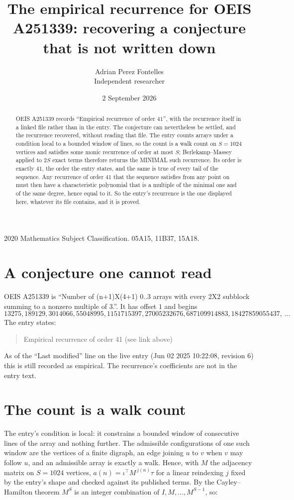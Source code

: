 \documentclass[11pt,a4paper]{article}
\title{The empirical recurrence for OEIS A251339: recovering a conjecture that is not written down}
\author{Adrian Perez Fontelles\\ \small Independent researcher}
\date{2 September 2026}
\theoremstyle{plain}
\theoremstyle{definition}
\begin{document}
\maketitle

\begin{abstract}
OEIS A251339 records ``Empirical recurrence of order $41$'', with the recurrence itself in a
linked file rather than in the entry. The conjecture can nevertheless be settled, and the
recurrence recovered, without reading that file. The entry counts arrays under a condition
local to a bounded window of lines, so the count is a walk count on $S=1024$ vertices and
satisfies some monic recurrence of order at most $S$; Berlekamp--Massey applied to $2S$ exact
terms therefore returns the MINIMAL such recurrence. Its order is exactly $41$, the order
the entry states, and the same is true of every tail of the sequence. Any recurrence of order
$41$ that the sequence satisfies from any point on must then have a characteristic
polynomial that is a multiple of the minimal one and of the same degree, hence equal to it. So
the entry's recurrence is the one displayed here, whatever its file contains, and it is
proved.
\end{abstract}

\noindent\small 2020 Mathematics Subject Classification. 05A15, 11B37, 15A18.\normalsize

\section{A conjecture one cannot read}

OEIS A251339 is ``Number of (n+1)X(4+1) 0..3 arrays with every 2X2 subblock summing to a nonzero multiple of 3.''. It has offset $1$ and begins
\[
13275, 189129, 3014066, 55048995, 1151715397, 27005232676, 687109914883, 18427859055437,\ \dots
\]
The entry states:
\begin{quote}
Empirical recurrence of order 41 (see link above)
\end{quote}
As of the ``Last modified'' line on the live entry (Jun 02 2025 10:22:08, revision 6) this is still
recorded as empirical. The recurrence's coefficients are not in the entry text.

\section{The count is a walk count}

The entry's condition is local: it constrains a bounded window of consecutive lines of the
array and nothing further. The admissible configurations of one such window are the vertices
of a finite digraph, an edge joining $u$ to $v$ when $v$ may follow $u$, and an admissible
array is exactly a walk. Hence, with $M$ the adjacency matrix on $S=1024$ vertices,
$a(n)=\iota^{\!\top}M^{\,j(n)}\tau$ for a linear reindexing $j$ fixed by the entry's shape
and checked against its published terms. By the Cayley--Hamilton theorem $M^{S}$ is an
integer combination of $I,M,\dots,M^{S-1}$, so:
\end{document}

